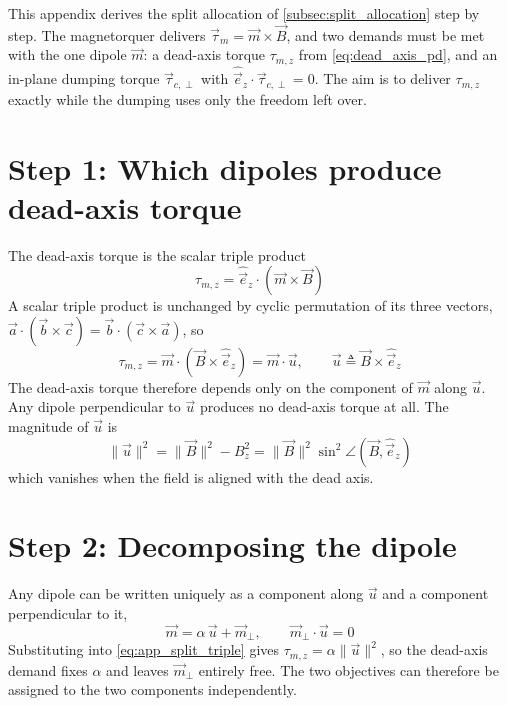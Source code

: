 This appendix derives the split allocation of \autoref{subsec:split_allocation} step by step. The magnetorquer delivers $\vec{\tau}_m = \vec{m}\times\vec{B}$, and two demands must be met with the one dipole $\vec{m}$: a dead-axis torque $\tau_{m,z}$ from \autoref{eq:dead_axis_pd}, and an in-plane dumping torque $\vec{\tau}_{c,\perp}$ with $\hat{\vec{e}}_z\cdot\vec{\tau}_{c,\perp} = 0$. The aim is to deliver $\tau_{m,z}$ exactly while the dumping uses only the freedom left over.

\section*{Step 1: Which dipoles produce dead-axis torque}
The dead-axis torque is the scalar triple product
\begin{equation*}
    \tau_{m,z} = \hat{\vec{e}}_z\cdot(\vec{m}\times\vec{B})
\end{equation*}
A scalar triple product is unchanged by cyclic permutation of its three vectors, $\vec{a}\cdot(\vec{b}\times\vec{c}) = \vec{b}\cdot(\vec{c}\times\vec{a})$, so
\begin{equation}
    \tau_{m,z} = \vec{m}\cdot(\vec{B}\times\hat{\vec{e}}_z) = \vec{m}\cdot\vec{u}, \qquad \vec{u} \triangleq \vec{B}\times\hat{\vec{e}}_z
    \label{eq:app_split_triple}
\end{equation}
The dead-axis torque therefore depends only on the component of $\vec{m}$ along $\vec{u}$. Any dipole perpendicular to $\vec{u}$ produces no dead-axis torque at all. The magnitude of $\vec{u}$ is
\begin{equation}
    \|\vec{u}\|^2 = \|\vec{B}\|^2 - B_z^2 = \|\vec{B}\|^2\sin^2\angle(\vec{B},\hat{\vec{e}}_z)
    \label{eq:app_split_u_norm}
\end{equation}
which vanishes when the field is aligned with the dead axis.

\section*{Step 2: Decomposing the dipole}
Any dipole can be written uniquely as a component along $\vec{u}$ and a component perpendicular to it,
\begin{equation*}
    \vec{m} = \alpha\,\vec{u} + \vec{m}_\perp, \qquad \vec{m}_\perp\cdot\vec{u} = 0
\end{equation*}
Substituting into \autoref{eq:app_split_triple} gives $\tau_{m,z} = \alpha\|\vec{u}\|^2$, so the dead-axis demand fixes $\alpha$ and leaves $\vec{m}_\perp$ entirely free. The two objectives can therefore be assigned to the two components independently.

